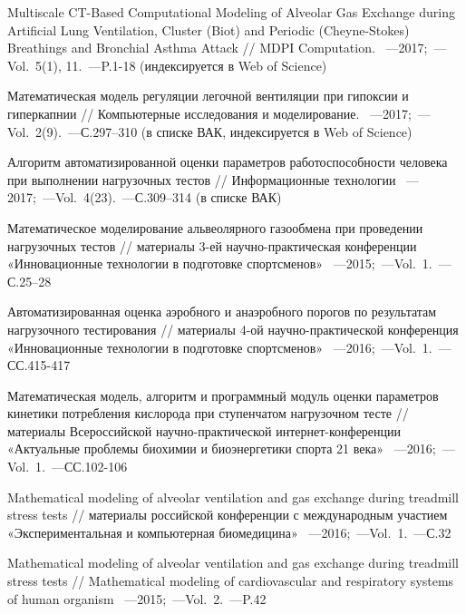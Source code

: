 \renewcommand{\refname}{\Large Публикации автора по теме диссертации}
\nocite{*}
\begin{thebibliography}{}
    
     Multiscale CT-Based Computational Modeling of Alveolar Gas Exchange during Artificial Lung Ventilation, Cluster (Biot) and Periodic (Cheyne-Stokes) Breathings and Bronchial Asthma Attack // MDPI Computation. ~---2017;~---Vol.~5(1), 11.~---P.1-18 (индексируется в Web of Science)
    
     Математическая модель регуляции легочной вентиляции при гипоксии и гиперкапнии // Компьютерные исследования и моделирование. ~---2017;~---Vol.~2(9).~---С.297–310 (в списке ВАК, индексируется в Web of Science)
    
     Алгоритм автоматизированной оценки параметров работоспособности человека при выполнении нагрузочных тестов // Информационные технологии ~---2017;~---Vol.~4(23).~---С.309–314 (в списке ВАК)

     Математическое моделирование альвеолярного газообмена при проведении нагрузочных тестов // материалы 3-ей научно-практическая конференции «Инновационные технологии в подготовке спортсменов» ~---2015;~---Vol.~1.~---С.25–28
    
     Автоматизированная оценка аэробного и анаэробного порогов по результатам нагрузочного тестирования // материалы 4-ой научно-практической конференция «Инновационные технологии в подготовке спортсменов» ~---2016;~---Vol.~1.~---СС.415-417
    
     Математическая модель, алгоритм и программный модуль оценки параметров кинетики потребления кислорода при ступенчатом нагрузочном тесте // материалы Всероссийской научно-практической интернет-конференции «Актуальные проблемы биохимии и биоэнергетики спорта 21 века» ~---2016;~---Vol.~1.~---СС.102-106

     Mathematical modeling of alveolar ventilation and gas exchange during treadmill stress tests // материалы российской конференции с международным участием «Экспериментальная и компьютерная биомедицина» ~---2016;~---Vol.~1.~---С.32
    
     Mathematical modeling of alveolar ventilation and gas exchange during treadmill stress tests // Mathematical modeling of cardiovascular and  respiratory systems of human organism ~---2015;~---Vol.~2.~---P.42
\end{thebibliography}

